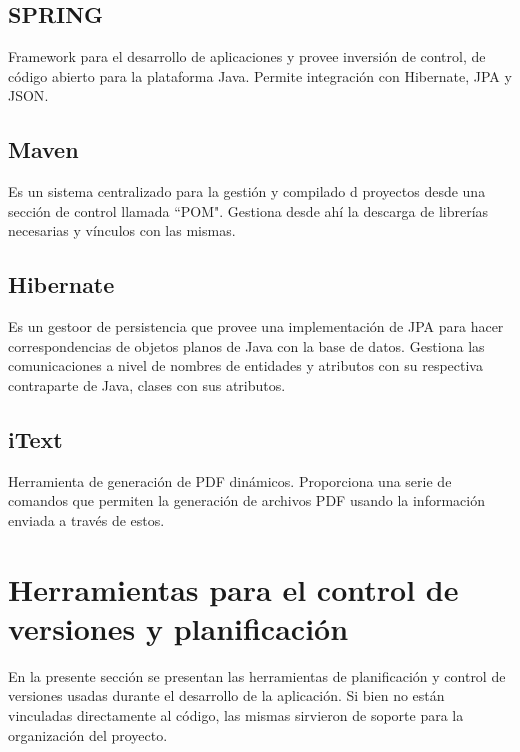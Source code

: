         \subsection{SPRING}
        
        Framework para el desarrollo de aplicaciones y provee inversión de control, de código abierto para la plataforma Java. Permite integración con Hibernate, JPA y JSON\cite{SPRING-essential}.
        
        \subsection{Maven}
        
        Es un sistema centralizado para la gestión y compilado d proyectos desde una sección de control llamada ``POM"\cite{MAVEN-basico}. Gestiona desde ahí la descarga de librerías necesarias y vínculos con las mismas.
        
        \subsection{Hibernate}
        
        Es un gestoor de persistencia que provee una implementación de JPA para hacer correspondencias de objetos planos de Java con la base de datos\cite{HIBERNATE-basico}. Gestiona las comunicaciones a nivel de nombres de entidades y atributos con su respectiva contraparte de Java, clases con sus atributos.
        
        \subsection{iText}
        
        Herramienta de generación de PDF dinámicos\cite{ITEXT-basico}. Proporciona una serie de comandos que permiten la generación de archivos PDF usando la información enviada a través de estos.
        
    \section{Herramientas para el control de versiones y planificación}
    
    En la presente sección se presentan las herramientas de planificación y control de versiones usadas durante el desarrollo de la aplicación. Si bien no están vinculadas directamente al código, las mismas sirvieron de soporte para la organización del proyecto.
    
